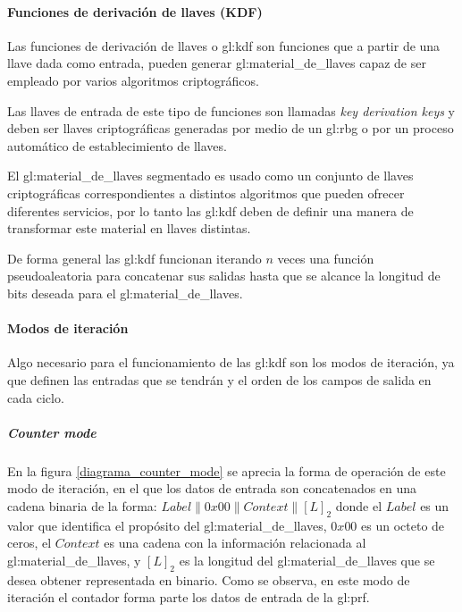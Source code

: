 \paragraph{Funciones de derivación de llaves (KDF)}

Las funciones de derivación de llaves o \gls{gl:kdf} son funciones que a
partir de una llave dada como entrada, pueden generar
\gls{gl:material_de_llaves} capaz de ser empleado por varios algoritmos
criptográficos.

Las llaves de entrada de este tipo de funciones son llamadas \textit{key
derivation keys} y deben ser llaves criptográficas generadas por medio de un
\gls{gl:rbg} o por un proceso automático de establecimiento de llaves.

El \gls{gl:material_de_llaves} segmentado es usado como un conjunto de llaves
criptográficas correspondientes a distintos algoritmos que pueden ofrecer
diferentes servicios, por lo tanto las \gls{gl:kdf} deben de definir una
manera de transformar este material en llaves distintas.

De forma general las \gls{gl:kdf} funcionan iterando $n$ veces una función
pseudoaleatoria para concatenar sus salidas hasta que se alcance la longitud
de bits deseada para el \gls{gl:material_de_llaves}.

\paragraph{Modos de iteración}

Algo necesario para el funcionamiento de las \gls{gl:kdf} son los modos de
iteración, ya que definen las entradas que se tendrán y el orden de los campos
de salida en cada ciclo.

\subparagraph{Counter mode}
En la figura \ref{diagrama_counter_mode} se aprecia la forma de operación de
este modo de iteración, en el que los datos de entrada son concatenados en una
cadena binaria de la forma: $Label \parallel 0x00 \parallel Context \parallel
{[L]}_2$ donde el $Label$ es un valor que identifica el propósito del
\gls{gl:material_de_llaves}, $0x00$ es un octeto de ceros, el $Context$ es una
cadena con la información relacionada al \gls{gl:material_de_llaves}, y
${[L]}_2$ es la longitud del \gls{gl:material_de_llaves} que se desea obtener
representada en binario. Como se observa, en este modo de iteración el
contador forma parte los datos de entrada de la \gls{gl:prf}.

